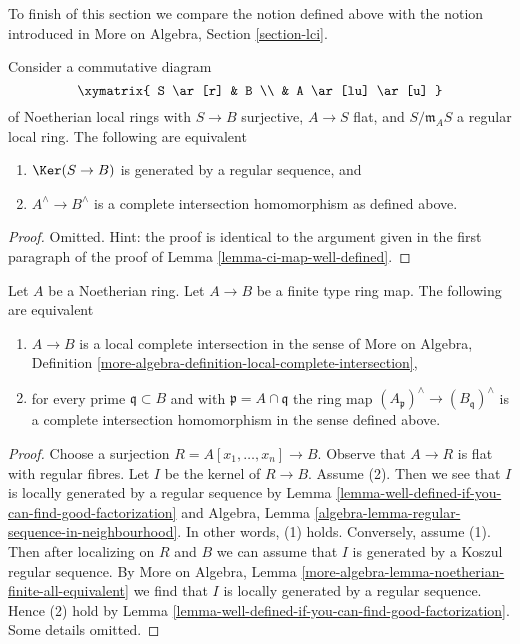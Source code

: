 \noindent
To finish of this section we compare the notion defined above
with the notion introduced in
More on Algebra, Section \ref{section-lci}.

\begin{lemma}
\label{lemma-well-defined-if-you-can-find-good-factorization}
Consider a commutative diagram
$$
\xymatrix{
S \ar[r] & B \\
& A \ar[lu] \ar[u]
}
$$
of Noetherian local rings with $S \to B$ surjective, $A \to S$ flat, and
$S/\mathfrak m_A S$ a regular local ring. The following are equivalent
\begin{enumerate}
\item $\Ker(S \to B)$ is generated by a regular sequence, and
\item $A^\wedge \to B^\wedge$ is a complete intersection homomorphism
as defined above.
\end{enumerate}
\end{lemma}

\begin{proof}
Omitted. Hint: the proof is identical to the argument given in
the first paragraph of the proof of Lemma \ref{lemma-ci-map-well-defined}.
\end{proof}

\begin{lemma}
\label{lemma-finite-type-lci-map}
Let $A$ be a Noetherian ring.
Let $A \to B$ be a finite type ring map.
The following are equivalent
\begin{enumerate}
\item $A \to B$ is a local complete intersection in the sense of
More on Algebra, Definition
\ref{more-algebra-definition-local-complete-intersection},
\item for every prime $\mathfrak q \subset B$ and with
$\mathfrak p = A \cap \mathfrak q$ the ring map
$(A_\mathfrak p)^\wedge \to (B_\mathfrak q)^\wedge$ is
a complete intersection homomorphism in the sense defined above.
\end{enumerate}
\end{lemma}

\begin{proof}
Choose a surjection $R = A[x_1, \ldots, x_n] \to B$.
Observe that $A \to R$ is flat with regular fibres.
Let $I$ be the kernel of $R \to B$.
Assume (2). Then we see that
$I$ is locally generated by a regular sequence
by
Lemma \ref{lemma-well-defined-if-you-can-find-good-factorization}
and
Algebra, Lemma \ref{algebra-lemma-regular-sequence-in-neighbourhood}.
In other words, (1) holds.
Conversely, assume (1). Then after localizing on $R$ and $B$
we can assume that $I$ is generated by a Koszul regular sequence.
By More on Algebra, Lemma
\ref{more-algebra-lemma-noetherian-finite-all-equivalent}
we find that $I$ is locally generated by a regular sequence.
Hence (2) hold by
Lemma \ref{lemma-well-defined-if-you-can-find-good-factorization}.
Some details omitted.
\end{proof}

